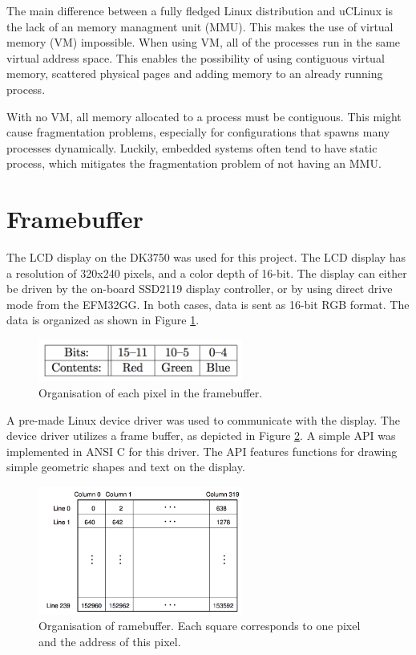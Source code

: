The main difference between a fully fledged Linux distribution and uCLinux is the lack of an memory managment unit (MMU). This makes the use of virtual memory (VM) impossible. When using VM, all of the processes run in the same virtual address space. This enables the possibility of using contiguous virtual memory, scattered physical pages and adding memory to an already running process.

With no VM, all memory allocated to a process must be contiguous. This might cause fragmentation problems, especially for configurations that spawns many processes dynamically. Luckily, embedded systems often tend to have static process, which mitigates the fragmentation problem of not having an MMU.   

\section{Framebuffer}

The LCD display on the DK3750 was used for this project. The LCD display has a resolution of 320x240 pixels, and a color depth of 16-bit. The display can either be driven by the on-board SSD2119 display controller, or by using direct drive mode from the EFM32GG. In both cases, data is sent as 16-bit RGB format. The data is organized as shown in Figure \ref{fig:display_format}. 

\begin{figure}[h]
\centering
\includegraphics[width=0.6\textwidth]{images/display_format.png}
\caption{Organisation of each pixel in the framebuffer. \cite{COMPENDIUM}}
\label{fig:display_format}
\end{figure}

A pre-made Linux device driver was used to communicate with the display. The device driver utilizes a frame buffer, as depicted in Figure \ref{fig:framebuffer}. A simple API was implemented in ANSI C for this driver. The API features functions for drawing simple geometric shapes and text on the display.  

\begin{figure}[h]
\centering
\includegraphics[width=0.6\textwidth]{images/framebuffer.png}
\caption{Organisation of ramebuffer. Each square corresponds to one pixel and the address of this pixel. \cite{COMPENDIUM}}
\label{fig:framebuffer}
\end{figure}


